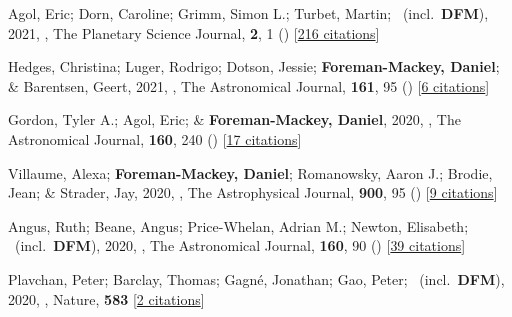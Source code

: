 \item[{\color{numcolor}\scriptsize62}] Agol, Eric; Dorn, Caroline; Grimm, Simon L.; Turbet, Martin; \etal\ (incl.\ \textbf{DFM}), 2021, , The Planetary Science Journal, \textbf{2}, 1 () [\href{https://ui.adsabs.harvard.edu/abs/2021PSJ.....2....1A}{216 citations}]

\item[{\color{numcolor}\scriptsize61}] Hedges, Christina; Luger, Rodrigo; Dotson, Jessie; \textbf{Foreman-Mackey, Daniel}; \& Barentsen, Geert, 2021, , The Astronomical Journal, \textbf{161}, 95 () [\href{https://ui.adsabs.harvard.edu/abs/2021AJ....161...95H}{6 citations}]

\item[{\color{numcolor}\scriptsize60}] Gordon, Tyler A.; Agol, Eric; \& \textbf{Foreman-Mackey, Daniel}, 2020, , The Astronomical Journal, \textbf{160}, 240 () [\href{https://ui.adsabs.harvard.edu/abs/2020AJ....160..240G}{17 citations}]

\item[{\color{numcolor}\scriptsize59}] Villaume, Alexa; \textbf{Foreman-Mackey, Daniel}; Romanowsky, Aaron J.; Brodie, Jean; \& Strader, Jay, 2020, , The Astrophysical Journal, \textbf{900}, 95 () [\href{https://ui.adsabs.harvard.edu/abs/2020ApJ...900...95V}{9 citations}]

\item[{\color{numcolor}\scriptsize58}] Angus, Ruth; Beane, Angus; Price-Whelan, Adrian M.; Newton, Elisabeth; \etal\ (incl.\ \textbf{DFM}), 2020, , The Astronomical Journal, \textbf{160}, 90 () [\href{https://ui.adsabs.harvard.edu/abs/2020AJ....160...90A}{39 citations}]

\item[{\color{numcolor}\scriptsize57}] Plavchan, Peter; Barclay, Thomas; Gagn{\'e}, Jonathan; Gao, Peter; \etal\ (incl.\ \textbf{DFM}), 2020, , Nature, \textbf{583} [\href{https://ui.adsabs.harvard.edu/abs/2020Natur.583E..31P}{2 citations}]


